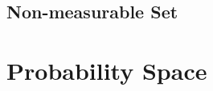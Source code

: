\subsection{Non-measurable Set}\label{sec:nonmeasurable_set}



\section{Probability Space}\label{sec:probability_space}
